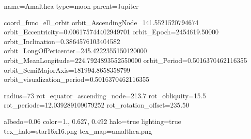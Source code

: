 \begin{configfile}
[amalthea]
name=Amalthea
type=moon
parent=Jupiter

coord_func=ell_orbit
orbit_AscendingNode=141.5521520794674
orbit_Eccentricity=0.006175744402949701
orbit_Epoch=2454619.50000
orbit_Inclination=0.3864576103404582
orbit_LongOfPericenter=245.4222355150120000
orbit_MeanLongitude=224.7924893552550000
orbit_Period=0.5016370462116355
orbit_SemiMajorAxis=181994.8658358799
orbit_visualization_period=0.5016370462116355

radius=73
rot_equator_ascending_node=213.7
rot_obliquity=15.5
rot_periode=12.039289109079252
rot_rotation_offset=235.50

albedo=0.06
color=1., 0.627, 0.492
halo=true
lighting=true
tex_halo=star16x16.png
tex_map=amalthea.png
\end{configfile}

